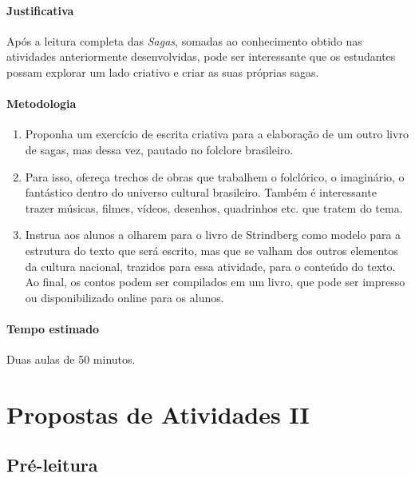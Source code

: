 \documentclass[12pt]{extarticle}
\begin{document}
\paragraph{Justificativa} Após a leitura completa das \emph{Sagas}, somadas ao
conhecimento obtido nas atividades anteriormente desenvolvidas, pode ser interessante 
que os estudantes possam explorar um lado criativo e criar as suas próprias sagas.

\paragraph{Metodologia}

\begin{enumerate}

\item Proponha
um exercício de escrita criativa para a elaboração de um outro livro de
sagas, mas dessa vez, pautado no folclore brasileiro.

\item Para isso, ofereça
trechos de obras que trabalhem o folclórico, o imaginário, o fantástico
dentro do universo cultural brasileiro. Também é interessante trazer
músicas, filmes, vídeos, desenhos, quadrinhos etc. que tratem do tema.

\item Instrua aos alunos a olharem para o livro de Strindberg como modelo para
a estrutura do texto que será escrito, mas que se valham dos outros
elementos da cultura nacional, trazidos para essa atividade, para o
conteúdo do texto. Ao final, os contos podem ser compilados em um livro,
que pode ser impresso ou disponibilizado online para os alunos.

\end{enumerate}

\paragraph{Tempo estimado} Duas aulas de 50 minutos.



\section{Propostas de Atividades II}

\subsection{Pré-leitura}
\end{document}
